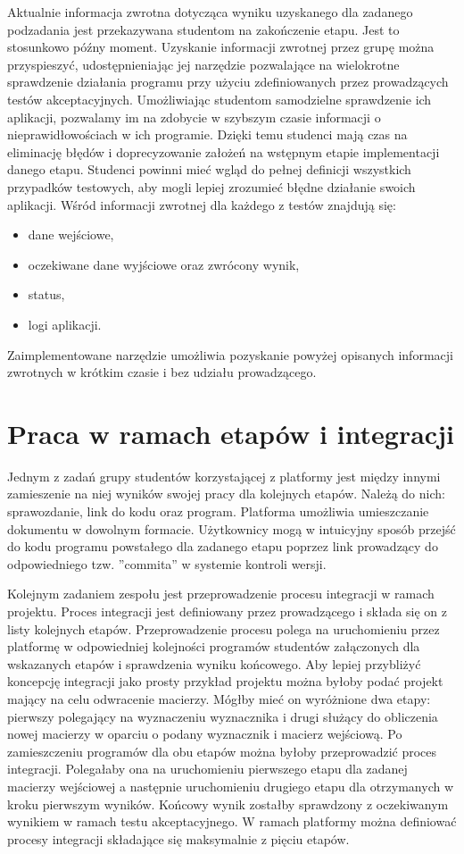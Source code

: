 Aktualnie informacja zwrotna dotycząca wyniku uzyskanego dla zadanego podzadania jest przekazywana studentom na zakończenie etapu.
Jest to stosunkowo późny moment.
Uzyskanie informacji zwrotnej przez grupę można przyspieszyć, udostępnieniając jej narzędzie pozwalające na wielokrotne sprawdzenie działania programu przy użyciu zdefiniowanych przez prowadzących testów akceptacyjnych.
Umożliwiając studentom samodzielne sprawdzenie ich aplikacji, pozwalamy im na zdobycie w szybszym czasie informacji o nieprawidłowościach w ich programie.
Dzięki temu studenci mają czas na eliminację błędów i doprecyzowanie założeń na wstępnym etapie implementacji danego etapu.
Studenci powinni mieć wgląd do pełnej definicji wszystkich przypadków testowych, aby mogli lepiej zrozumieć błędne działanie swoich aplikacji.
Wśród informacji zwrotnej dla każdego z testów znajdują się:
\begin{itemize}
    \item dane wejściowe,
    \item oczekiwane dane wyjściowe oraz zwrócony wynik,
    \item status,
    \item logi aplikacji.
\end{itemize}

Zaimplementowane narzędzie umożliwia pozyskanie powyżej opisanych informacji zwrotnych w krótkim czasie i bez udziału prowadzącego.


\section{Praca w ramach etapów i integracji}

Jednym z zadań grupy studentów korzystającej z platformy jest między innymi zamieszenie na niej wyników swojej pracy dla kolejnych etapów.
Należą do nich: sprawozdanie, link do kodu oraz program.
Platforma umożliwia umieszczanie dokumentu w dowolnym formacie.
Użytkownicy mogą w intuicyjny sposób przejść do kodu programu powstałego dla zadanego etapu poprzez link prowadzący do odpowiedniego tzw. ”commita” w systemie kontroli wersji.

Kolejnym zadaniem zespołu jest przeprowadzenie procesu integracji w ramach projektu.
Proces integracji jest definiowany przez prowadzącego i składa się on z listy kolejnych etapów.
Przeprowadzenie procesu polega na uruchomieniu przez platformę w odpowiedniej kolejności programów studentów załączonych dla wskazanych etapów i sprawdzenia wyniku końcowego.
Aby lepiej przybliżyć koncepcję integracji jako prosty przykład projektu można byłoby podać projekt mający na celu odwracenie macierzy.
Mógłby mieć on wyróżnione dwa etapy: pierwszy polegający na wyznaczeniu wyznacznika i drugi służący do obliczenia nowej macierzy w oparciu o podany wyznacznik i macierz wejściową.
Po zamieszczeniu programów dla obu etapów można byłoby przeprowadzić proces integracji.
Polegałaby ona na uruchomieniu pierwszego etapu dla zadanej macierzy wejściowej a następnie uruchomieniu drugiego etapu dla otrzymanych w kroku pierwszym wyników.
Końcowy wynik zostałby sprawdzony z oczekiwanym wynikiem w ramach testu akceptacyjnego.
W ramach platformy można definiować procesy integracji składające się maksymalnie z pięciu etapów.

